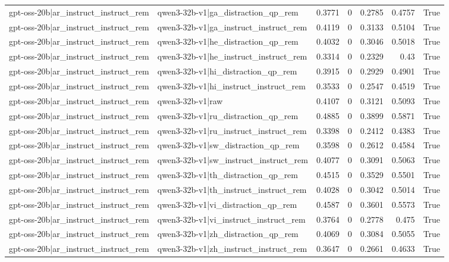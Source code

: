 \begin{table}
\begin{tabular}{l l r r r r l}
gpt-oss-20b|ar_instruct_instruct_rem & qwen3-32b-v1|ga_distraction_qp_rem & 0.3771 & 0 & 0.2785 & 0.4757 & True \\
gpt-oss-20b|ar_instruct_instruct_rem & qwen3-32b-v1|ga_instruct_instruct_rem & 0.4119 & 0 & 0.3133 & 0.5104 & True \\
gpt-oss-20b|ar_instruct_instruct_rem & qwen3-32b-v1|he_distraction_qp_rem & 0.4032 & 0 & 0.3046 & 0.5018 & True \\
gpt-oss-20b|ar_instruct_instruct_rem & qwen3-32b-v1|he_instruct_instruct_rem & 0.3314 & 0 & 0.2329 & 0.43 & True \\
gpt-oss-20b|ar_instruct_instruct_rem & qwen3-32b-v1|hi_distraction_qp_rem & 0.3915 & 0 & 0.2929 & 0.4901 & True \\
gpt-oss-20b|ar_instruct_instruct_rem & qwen3-32b-v1|hi_instruct_instruct_rem & 0.3533 & 0 & 0.2547 & 0.4519 & True \\
gpt-oss-20b|ar_instruct_instruct_rem & qwen3-32b-v1|raw & 0.4107 & 0 & 0.3121 & 0.5093 & True \\
gpt-oss-20b|ar_instruct_instruct_rem & qwen3-32b-v1|ru_distraction_qp_rem & 0.4885 & 0 & 0.3899 & 0.5871 & True \\
gpt-oss-20b|ar_instruct_instruct_rem & qwen3-32b-v1|ru_instruct_instruct_rem & 0.3398 & 0 & 0.2412 & 0.4383 & True \\
gpt-oss-20b|ar_instruct_instruct_rem & qwen3-32b-v1|sw_distraction_qp_rem & 0.3598 & 0 & 0.2612 & 0.4584 & True \\
gpt-oss-20b|ar_instruct_instruct_rem & qwen3-32b-v1|sw_instruct_instruct_rem & 0.4077 & 0 & 0.3091 & 0.5063 & True \\
gpt-oss-20b|ar_instruct_instruct_rem & qwen3-32b-v1|th_distraction_qp_rem & 0.4515 & 0 & 0.3529 & 0.5501 & True \\
gpt-oss-20b|ar_instruct_instruct_rem & qwen3-32b-v1|th_instruct_instruct_rem & 0.4028 & 0 & 0.3042 & 0.5014 & True \\
gpt-oss-20b|ar_instruct_instruct_rem & qwen3-32b-v1|vi_distraction_qp_rem & 0.4587 & 0 & 0.3601 & 0.5573 & True \\
gpt-oss-20b|ar_instruct_instruct_rem & qwen3-32b-v1|vi_instruct_instruct_rem & 0.3764 & 0 & 0.2778 & 0.475 & True \\
gpt-oss-20b|ar_instruct_instruct_rem & qwen3-32b-v1|zh_distraction_qp_rem & 0.4069 & 0 & 0.3084 & 0.5055 & True \\
gpt-oss-20b|ar_instruct_instruct_rem & qwen3-32b-v1|zh_instruct_instruct_rem & 0.3647 & 0 & 0.2661 & 0.4633 & True \\

\end{tabular}
\end{table}
